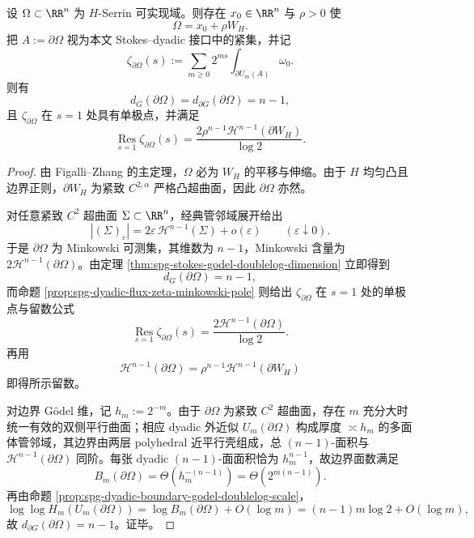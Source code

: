 \begin{theorem}\label{thm:conclusion-serrin-wulff-dyadic-codim-law}
设 \(\Omega\subset\RR^n\) 为 \(H\)-Serrin 可实现域。则存在 \(x_0\in\RR^n\) 与 \(\rho>0\) 使
\[
\Omega=x_0+\rho W_H.
\]
把 \(A:=\partial\Omega\) 视为本文 Stokes--dyadic 接口中的紧集，并记
\[
\zeta_{\partial\Omega}(s):=\sum_{m\ge 0}2^{ms}\int_{\partial U_m(A)}\omega_0.
\]
则有
\[
d_G(\partial\Omega)=d_{\partial G}(\partial\Omega)=n-1,
\]
且 \(\zeta_{\partial\Omega}\) 在 \(s=1\) 处具有单极点，并满足
\[
\operatorname*{Res}_{s=1}\zeta_{\partial\Omega}(s)
=
\frac{2\rho^{n-1}\mathcal H^{n-1}(\partial W_H)}{\log 2}.
\]
\end{theorem}
\begin{proof}
由 Figalli--Zhang 的主定理，\(\Omega\) 必为 \(W_H\) 的平移与伸缩。由于 \(H\) 均匀凸且边界正则，\(\partial W_H\) 为紧致 \(C^{2,\alpha}\) 严格凸超曲面，因此 \(\partial\Omega\) 亦然。

对任意紧致 \(C^2\) 超曲面 \(\Sigma\subset\RR^n\)，经典管邻域展开给出
\[
|(\Sigma)_\varepsilon|
=
2\varepsilon\,\mathcal H^{n-1}(\Sigma)+o(\varepsilon)
\qquad(\varepsilon\downarrow 0).
\]
于是 \(\partial\Omega\) 为 Minkowski 可测集，其维数为 \(n-1\)，Minkowski 含量为 \(2\mathcal H^{n-1}(\partial\Omega)\)。由定理 \ref{thm:spg-stokes-godel-doublelog-dimension} 立即得到
\[
d_G(\partial\Omega)=n-1,
\]
而命题 \ref{prop:spg-dyadic-flux-zeta-minkowski-pole} 则给出 \(\zeta_{\partial\Omega}\) 在 \(s=1\) 处的单极点与留数公式
\[
\operatorname*{Res}_{s=1}\zeta_{\partial\Omega}(s)
=
\frac{2\mathcal H^{n-1}(\partial\Omega)}{\log 2}.
\]
再用
\[
\mathcal H^{n-1}(\partial\Omega)=\rho^{n-1}\mathcal H^{n-1}(\partial W_H)
\]
即得所示留数。

对边界 Gödel 维，记 \(h_m:=2^{-m}\)。由于 \(\partial\Omega\) 为紧致 \(C^2\) 超曲面，存在 \(m\) 充分大时统一有效的双侧平行曲面；相应 dyadic 外近似 \(U_m(\partial\Omega)\) 构成厚度 \(\asymp h_m\) 的多面体管邻域，其边界由两层 polyhedral 近平行壳组成，总 \((n-1)\)-面积与 \(\mathcal H^{n-1}(\partial\Omega)\) 同阶。每张 dyadic \((n-1)\)-面面积恰为 \(h_m^{n-1}\)，故边界面数满足
\[
B_m(\partial\Omega)=\Theta(h_m^{-(n-1)})=\Theta(2^{m(n-1)}).
\]
再由命题 \ref{prop:spg-dyadic-boundary-godel-doublelog-scale}，
\[
\log\log H_m(U_m(\partial\Omega))
=
\log B_m(\partial\Omega)+O(\log m)
=
(n-1)m\log 2+O(\log m),
\]
故 \(d_{\partial G}(\partial\Omega)=n-1\)。证毕。
\end{proof}

